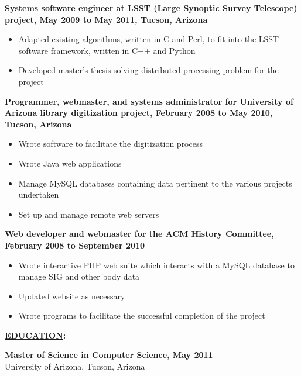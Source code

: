 \documentclass[10pt]{res}
\begin{document}
\begin{resume}
\begin{flushleft}
{\bf Systems software engineer at LSST (Large Synoptic Survey Telescope) project, May 2009 to May 2011, Tucson, Arizona}
\end{flushleft}

\begin{itemize}
\setlength{\itemsep}{1pt}
\setlength{\parskip}{0pt}
\setlength{\parsep}{0pt}
\item Adapted existing algorithms, written in C and Perl, to fit into the LSST software framework, written in C++ and Python
\item Developed master's thesis  solving distributed processing problem for the project
\end{itemize}


\begin{flushleft}
{\bf Programmer, webmaster, and systems administrator for University of Arizona library digitization project, February 2008 to May 2010, Tucson, Arizona}
\end{flushleft}

\begin{itemize}
\setlength{\itemsep}{1pt}
\setlength{\parskip}{0pt}
\setlength{\parsep}{0pt}
\item Wrote software to facilitate the digitization process
\item Wrote Java web applications
\item Manage MySQL databases containing data pertinent to the various projects undertaken
\item Set up and manage remote web servers
\end{itemize}

\begin{flushleft}
{\bf Web developer and webmaster for the ACM History Committee, February 2008 to September 2010}
\end{flushleft}

\begin{itemize}
\setlength{\itemsep}{1pt}
\setlength{\parskip}{0pt}
\setlength{\parsep}{0pt}
\item Wrote interactive PHP web suite which interacts with a MySQL database to manage SIG and other body data
\item Updated website as necessary
\item Wrote programs to facilitate the successful completion of the project
\end{itemize}

\begin{flushleft}
{\bf \underline{EDUCATION}:}
\end{flushleft}
{\bf Master of Science in Computer Science, May 2011}\\
University of Arizona, Tucson, Arizona


\end{resume}
\end{document}
